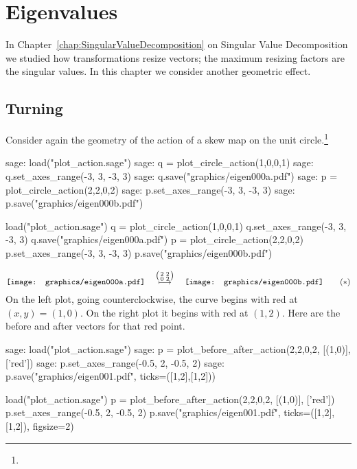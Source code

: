\chapter{Eigenvalues}

In Chapter~\ref{chap:SingularValueDecomposition} on 
Singular Value Decomposition we studied how
transformations resize vectors; the maximum resizing factors
are the singular values.
In this chapter we consider another geometric effect.


\section{Turning}
Consider again the geometry of the action of a skew map on the unit 
circle.\footnote{\noterightmult}
\begin{sagecommandline}
sage: load("plot_action.sage")  
sage: q = plot_circle_action(1,0,0,1) 
sage: q.set_axes_range(-3, 3, -3, 3) 
sage: q.save("graphics/eigen000a.pdf")
sage: p = plot_circle_action(2,2,0,2) 
sage: p.set_axes_range(-3, 3, -3, 3) 
sage: p.save("graphics/eigen000b.pdf")
\end{sagecommandline}
\begin{sagesilent}
load("plot_action.sage")  
q = plot_circle_action(1,0,0,1) 
q.set_axes_range(-3, 3, -3, 3) 
q.save("graphics/eigen000a.pdf")
p = plot_circle_action(2,2,0,2) 
p.set_axes_range(-3, 3, -3, 3) 
p.save("graphics/eigen000b.pdf")
\end{sagesilent}
\begin{equation*} \label{gr:firstgraphic}
  \vcenteredhbox{\texttt{[image: graphics/eigen000a.pdf]}}
  \quad\mapsunder{\big (\begin{smallmatrix} 2 &2 \\ 0 &2 \end{smallmatrix}\big )}\quad
  \vcenteredhbox{\texttt{[image: graphics/eigen000b.pdf]}}
  \tag{$*$}
\end{equation*}
On the left plot, going counterclockwise, 
the curve begins with red at $(x,y)=(1,0)$.
On the right plot it begins with red at $(1,2)$.
Here are the before and after vectors for that red point.
\begin{sagecommandline}
sage: load("plot_action.sage")  
sage: p = plot_before_after_action(2,2,0,2, [(1,0)], ['red']) 
sage: p.set_axes_range(-0.5, 2, -0.5, 2) 
sage: p.save("graphics/eigen001.pdf", ticks=([1,2],[1,2]))
\end{sagecommandline}
\begin{sagesilent}
load("plot_action.sage")  
p = plot_before_after_action(2,2,0,2, [(1,0)], ['red']) 
p.set_axes_range(-0.5, 2, -0.5, 2) 
p.save("graphics/eigen001.pdf", ticks=([1,2],[1,2]), figsize=2)
\end{sagesilent}
